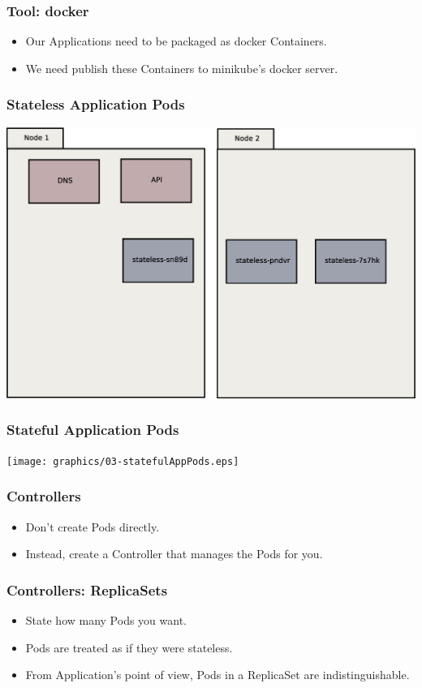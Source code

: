     \begin{frame}
        \frametitle{Tool: docker\footnotemark}
        \begin{itemize}
            \item Our Applications need to be packaged as docker Containers.
            \item We need publish these Containers to minikube's docker server.
        \end{itemize}
    \end{frame}

    \begin{frame}
        \frametitle{Stateless Application Pods}
        \includegraphics[width=\textwidth,height=0.85\textheight,keepaspectratio]{graphics/02-statelessAppPods.eps}
    \end{frame}

    \begin{frame}
        \frametitle{Stateful Application Pods}
        \texttt{[image: graphics/03-statefulAppPods.eps]}
    \end{frame}

    \begin{frame}
        \frametitle{Controllers}
        \begin{itemize}
            \item Don't create Pods directly.
            \item Instead, create a Controller that manages the Pods for you.
        \end{itemize}
    \end{frame}

    \begin{frame}
        \frametitle{Controllers: ReplicaSets}
        \begin{itemize}
            \item State how many Pods you want.\pause
            \item Pods are treated as if they were stateless.\pause
            \item From Application's point of view, Pods in a ReplicaSet are indistinguishable.
        \end{itemize}
    \end{frame}

